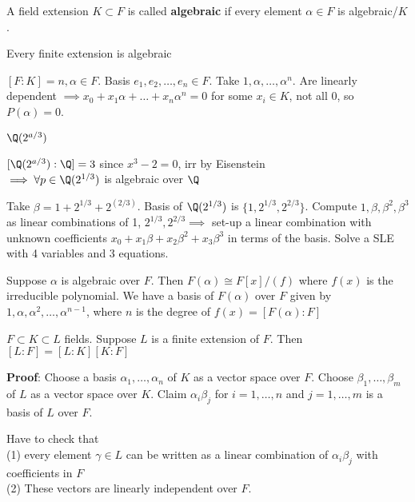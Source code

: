 \documentclass[twoside, 10pt]{article}
\begin{document}
\begin{defn}
    A field extension $K \subset F$ is called \textbf{algebraic} if every element $\alpha \in F$ is algebraic/$K$.
\end{defn}

\begin{thm}
    Every finite extension is algebraic
\end{thm}

$[F : K] = n, \alpha \in F$. Basis $e_1, e_2, \ldots, e_n \in F$. Take $1, \alpha, \ldots, \alpha^n$. Are linearly dependent $\implies x_0 + x_1\alpha + \ldots + x_n\alpha^n = 0$ for some $x_i \in K$, not all 0, so $P(\alpha) = 0$.

\begin{exm*}
    $\Q(2^{a/3})$
\end{exm*}
$[\Q(2^{a/3}) : \Q] = 3$ since $x^3 - 2 = 0$, irr by Eisenstein\\
$\implies \forall p \in \Q(2^{1/3})$ is algebraic over $\Q$

Take $\beta = 1 + 2^{1/3} + 2^(2/3)$. Basis of $\Q(2^{1/3})$ is $\{1, 2^{1/3}, 2^{2/3}\}$. Compute $1, \beta, \beta^2, \beta^3$ as linear combinations of 1, $2^{1/3}, 2^{2/3} \implies$ set-up a linear combination with unknown coefficients $x_0 + x_1\beta + x_2\beta^2 + x_3\beta^3$ in terms of the basis. Solve a SLE with 4 variables and 3 equations.

\begin{rmk}
    Suppose $\alpha$ is algebraic over $F$. Then $F(\alpha) \cong F[x]/(f)$ where $f(x)$ is the irreducible polynomial.
    We have a basis of $F(\alpha)$ over $F$ given by $1, \alpha, \alpha^2, \ldots, \alpha^{n-1}$, where $n$ is the degree of $f(x) = [F(\alpha) : F]$
\end{rmk}

\begin{thm}
    $F \subset K \subset L$ fields. Suppose $L$ is a finite extension of $F$. Then $[L : F] = [L : K][K : F]$
\end{thm}
\textbf{Proof}: Choose a basis $\alpha_1, \ldots, \alpha_n$ of $K$ as a vector space over $F$. Choose $\beta_1, \ldots, \beta_m$ of $L$ as a vector space over $K$. Claim $\alpha_i\beta_j$ for $i = 1, \ldots, n$ and $j = 1, \ldots, m$ is a basis of $L$ over $F$.

Have to check that \\
(1) every element $\gamma \in L$ can be written as a linear combination of $\alpha_i\beta_j$ with coefficients in $F$\\
(2) These vectors are linearly independent over $F$.
\end{document}
